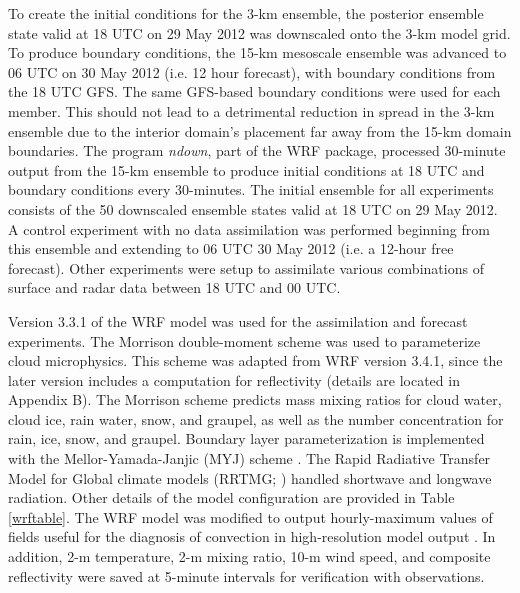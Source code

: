 To create the initial conditions for the 3-km ensemble, the posterior ensemble state valid at 18 UTC on 29 May 2012 was downscaled onto the 3-km model grid. To produce boundary conditions, the 15-km mesoscale ensemble was advanced to 06 UTC on 30 May 2012 (i.e. 12 hour forecast), with boundary conditions from the 18 UTC GFS. The same GFS-based boundary conditions were used for each member. This should not lead to a detrimental reduction in spread in the 3-km ensemble due to the interior domain’s placement far away from the 15-km domain boundaries. The program {\it ndown}, part of the WRF package, processed 30-minute output from the 15-km ensemble to produce initial conditions at 18 UTC and boundary conditions every 30-minutes. The initial ensemble for all experiments consists of the 50 downscaled ensemble states valid at 18 UTC on 29 May 2012. A control experiment with no data assimilation was performed beginning from this ensemble and extending to 06 UTC 30 May 2012 (i.e. a 12-hour free forecast). Other experiments were setup to assimilate various combinations of surface and radar data between 18 UTC and 00 UTC.

Version 3.3.1 of the WRF model was used for the assimilation and forecast experiments. The Morrison double-moment scheme \citep{morrisonetal09} was used to parameterize cloud microphysics. This scheme was adapted from WRF version 3.4.1, since the later version includes a computation for reflectivity (details are located in Appendix B). The Morrison scheme predicts mass mixing ratios for cloud water, cloud ice, rain water, snow, and graupel, as well as the number concentration for rain, ice, snow, and graupel. Boundary layer parameterization is implemented with the Mellor-Yamada-Janjic (MYJ) scheme \citep{janjic94}. The Rapid Radiative Transfer Model for Global climate models (RRTMG; \citealt{iaconoetal08}) handled shortwave and longwave radiation. Other details of the model configuration are provided in Table \ref{wrftable}. The WRF model was modified to output hourly-maximum values of fields useful for the diagnosis of convection in high-resolution model output \citep{kainetal10}. In addition, 2-m temperature, 2-m mixing ratio, 10-m wind speed, and composite reflectivity were saved at 5-minute intervals for verification with observations.

